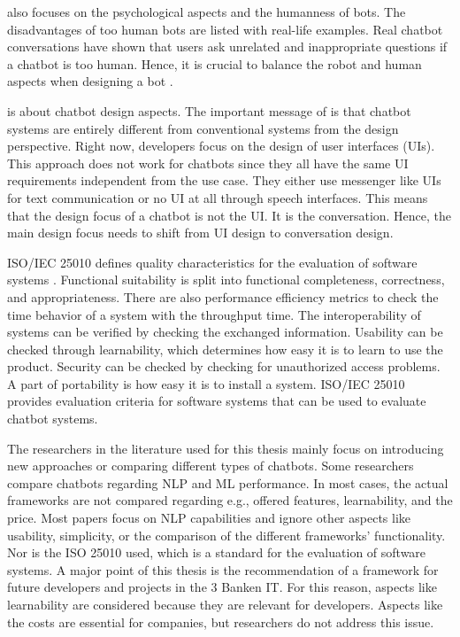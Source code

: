 \citet{brandtzaeg2018chatbots} also focuses on the psychological aspects and the humanness of bots.
The disadvantages of too human bots are listed with real-life examples. 
Real chatbot conversations have shown that users ask unrelated and inappropriate questions if a chatbot is too human. 
Hence, it is crucial to balance the robot and human aspects when designing a bot \cite{brandtzaeg2018chatbots}.

\citet{dutta2017developing} is about chatbot design aspects.
The important message of \citet{dutta2017developing} is that chatbot systems are entirely different from conventional systems from the design perspective.
Right now, developers focus on the design of user interfaces (UIs).
This approach does not work for chatbots since they all have the same UI requirements independent from the use case.
They either use messenger like UIs for text communication or no UI at all through speech interfaces.
This means that the design focus of a chatbot is not the UI.
It is the conversation.
Hence, the main design focus needs to shift from UI design to conversation design.




ISO/IEC 25010 defines quality characteristics for the evaluation of software systems \cite{iso25010}.
Functional suitability is split into functional completeness, correctness, and appropriateness.
There are also performance efficiency metrics to check the time behavior of a system with the throughput time.
The interoperability of systems can be verified by checking the exchanged information.
Usability can be checked through learnability, which determines how easy it is to learn to use the product.
Security can be checked by checking for unauthorized access problems.
A part of portability is how easy it is to install a system.
ISO/IEC 25010 provides evaluation criteria for software systems that can be used to evaluate chatbot systems.


The researchers in the literature used for this thesis mainly focus on introducing new approaches or comparing different types of chatbots.
Some researchers compare chatbots regarding NLP and ML performance.
In most cases, the actual frameworks are not compared regarding e.g., offered features, learnability, and the price.
Most papers focus on NLP capabilities and ignore other aspects like usability, simplicity, or the comparison of the different frameworks' functionality.
Nor is the ISO 25010\cite{iso25010} used, which is a standard for the evaluation of software systems.
A major point of this thesis is the recommendation of a framework for future developers and projects in the 3 Banken IT.
For this reason, aspects like learnability are considered because they are relevant for developers.
Aspects like the costs are essential for companies, but researchers do not address this issue.

